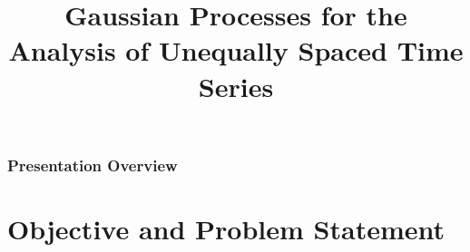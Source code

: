 \documentclass[
	8pt, %
]{beamer}
\title[Master's Thesis]{Gaussian Processes for the Analysis of Unequally Spaced Time Series} %
\author[Gianna Marano]{} %
\begin{document}

\begin{frame}
	\titlepage %
\end{frame}



\begin{frame}
	\frametitle{Presentation Overview} %

	\tableofcontents %
\end{frame}


\section{Objective and Problem Statement} %
\end{document}
